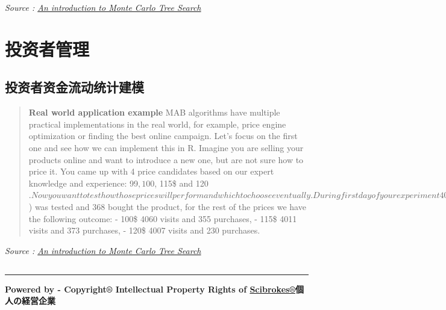 \documentclass[]{book}
\begin{document}
\emph{Source :
\href{https://appsilon.com/an-introduction-to-monte-carlo-tree-search/}{An
introduction to Monte Carlo Tree Search}}

\subsection{}\label{section-2}

\section{投资者管理}

\subsection{投资者资金流动统计建模}

\begin{quote}
\textbf{Real world application example} MAB algorithms have multiple
practical implementations in the real world, for example, price engine
optimization or finding the best online campaign. Let's focus on the
first one and see how we can implement this in R. Imagine you are
selling your products online and want to introduce a new one, but are
not sure how to price it. You came up with 4 price candidates based on
our expert knowledge and experience: 99\(, 100\), 115\$ and
120\(. Now you want to test how those prices will perform and which to choose eventually. During first day of your experiment 4000 people visited your shop when the first price (99\))
was tested and 368 bought the product, for the rest of the prices we
have the following outcome: - 100\$ 4060 visits and 355 purchases, -
115\$ 4011 visits and 373 purchases, - 120\$ 4007 visits and 230
purchases.
\end{quote}

\emph{Source :
\href{https://appsilon.com/an-introduction-to-monte-carlo-tree-search/}{An
introduction to Monte Carlo Tree Search}}

\subsection{}\label{section-3}

\begin{center}\rule{0.5\linewidth}{\linethickness}\end{center}

\textbf{Powered by - Copyright® Intellectual Property Rights of
\href{http://www.scibrokes.com}{Scibrokes®}個人の経営企業}
\end{document}
